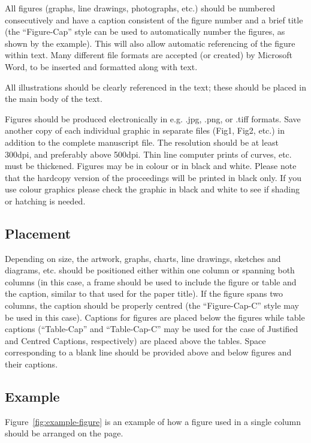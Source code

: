 \documentclass[bibtex,pagenumbers]{stabs2021}
\begin{document}
All figures (graphs, line drawings, photographs, etc.) should be
numbered consecutively and have a caption consistent of the figure
number and a brief title (the ``Figure-Cap'' style can be used to
automatically number the figures, as shown by the example). This will
also allow automatic referencing of the figure within text. Many
different file formats are accepted (or created) by Microsoft Word, to
be inserted and formatted along with text.

All illustrations should be clearly referenced in the text; these
should be placed in the main body of the text.

Figures should be produced electronically in e.g. .jpg, .png, or .tiff
formats. Save another copy of each individual graphic in separate
files (Fig1, Fig2, etc.) in addition to the complete manuscript file.
The resolution should be at least 300dpi, and preferably above 500dpi.
Thin line computer prints of curves, etc. must be thickened. Figures
may be in colour or in black and white. Please note that the hardcopy
version of the proceedings will be printed in black only. If you use
colour graphics please check the graphic in black and white to see if
shading or hatching is needed.

\subsection{Placement}

Depending on size, the artwork, graphs, charts, line drawings,
sketches and diagrams, etc. should be positioned either within one
column or spanning both columns (in this case, a frame should be used
to include the figure or table and the caption, similar to that used
for the paper title). If the figure spans two columns, the caption
should be properly centred (the ``Figure-Cap-C'' style may be used in
this case). Captions for figures are placed below the figures while
table captions (``Table-Cap'' and ``Table-Cap-C'' may be used for the
case of Justified and Centred Captions, respectively) are placed above
the tables. Space corresponding to a blank line should be provided
above and below figures and their captions.

\subsection{Example}

Figure~\ref{fig:example-figure} is an example of how a figure used in
a single column should be arranged on the page.
\end{document}
